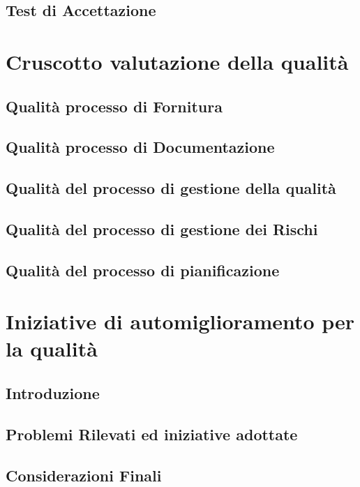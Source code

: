 \documentclass{article}
\begin{document}
\subsection{Test di Accettazione} %


\section{Cruscotto valutazione della qualità}


\subsection{Qualità processo di Fornitura}


\subsection{Qualità processo di Documentazione}


\subsection{Qualità del processo di gestione della qualità}


\subsection{Qualità del processo di gestione dei Rischi}


\subsection{Qualità del processo di pianificazione}


\section{Iniziative di automiglioramento per la qualità}


\subsection{Introduzione}


\subsection{Problemi Rilevati ed iniziative adottate}


\subsection{Considerazioni Finali}
\end{document}
